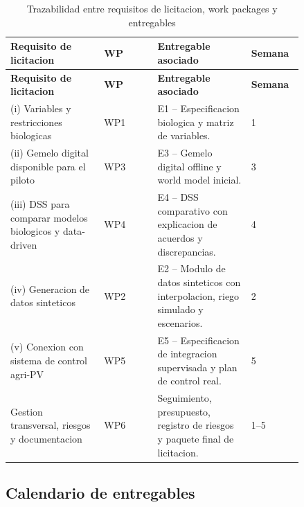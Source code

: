 ﻿\documentclass[11pt,a4paper]{article}
\begin{document}
\begin{longtable}{p{0.28\linewidth}p{0.16\linewidth}p{0.28\linewidth}p{0.12\linewidth}}
\caption{Trazabilidad entre requisitos de licitacion, work packages y entregables}\\
\toprule
\textbf{Requisito de licitacion} & \textbf{WP} & \textbf{Entregable asociado} & \textbf{Semana} \\
\midrule
\endfirsthead
\toprule
\textbf{Requisito de licitacion} & \textbf{WP} & \textbf{Entregable asociado} & \textbf{Semana} \\
\midrule
\endhead
(i) Variables y restricciones biologicas & WP1 & E1 -- Especificacion biologica y matriz de variables. & 1 \\ \addlinespace
(ii) Gemelo digital disponible para el piloto & WP3 & E3 -- Gemelo digital offline y world model inicial. & 3 \\ \addlinespace
(iii) DSS para comparar modelos biologicos y data-driven & WP4 & E4 -- DSS comparativo con explicacion de acuerdos y discrepancias. & 4 \\ \addlinespace
(iv) Generacion de datos sinteticos & WP2 & E2 -- Modulo de datos sinteticos con interpolacion, riego simulado y escenarios. & 2 \\ \addlinespace
(v) Conexion con sistema de control agri-PV & WP5 & E5 -- Especificacion de integracion supervisada y plan de control real. & 5 \\ \addlinespace
Gestion transversal, riesgos y documentacion & WP6 & Seguimiento, presupuesto, registro de riesgos y paquete final de licitacion. & 1--5 \\
\bottomrule
\end{longtable}

\subsection{Calendario de entregables}
\end{document}
